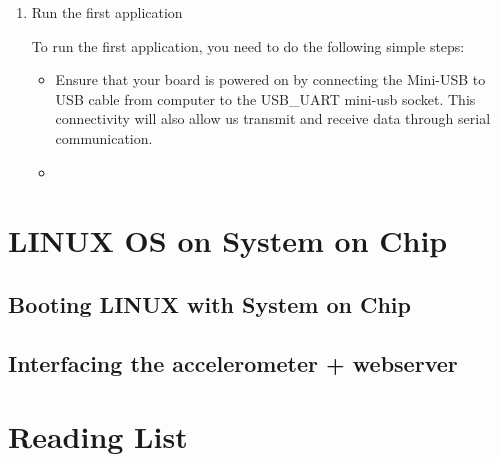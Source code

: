 \documentclass[portrait, margin=0.3in]{article}
\newenvironment{myitemize}
{ \begin{itemize}
    \setlength{\itemsep}{0pt}
    \setlength{\parskip}{0pt}
    \setlength{\parsep}{0pt}     }
{ \end{itemize}                  }
\begin{document}
\begin{enumerate}
\item Run the first application

To run the first application, you need to do the following simple steps:
\begin{myitemize}
\item Ensure that your board is powered on by connecting the Mini-USB to USB cable from computer to the USB\_UART mini-usb socket. This connectivity will also allow us transmit and receive data through serial communication.
\item 
\end{myitemize}

\end{enumerate}


















\clearpage

\section{LINUX OS on System on Chip}





\subsection{Booting LINUX with System on Chip}

\subsection{Interfacing the accelerometer + webserver}
 
 
\newpage
\section*{Reading List}


  
\end{document}
